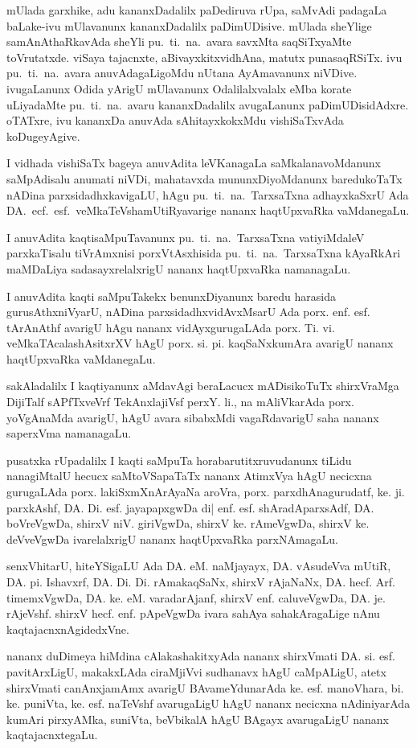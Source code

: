mUlada garxhike, adu kananxDadalilx paDediruva rUpa, saMvAdi padagaLa baLake-ivu mUlavanunx kananxDadalilx paDimUDisive. mUlada sheYlige samAnAthaRkavAda sheYli pu.~ti.~na.~avara savxMta saqSiTxyaMte toVrutatxde. viSaya tajacnxte, aBivayxkitxvidhAna, matutx punasaqRSiTx. ivu pu.~ti.~na.~avara anuvAdagaLigoMdu nUtana AyAmavanunx niVDive. ivugaLanunx Odida yArigU mUlavanunx Odalilalxvalalx eMba korate uLiyadaMte pu.~ti.~na.~avaru kananxDadalilx avugaLanunx paDimUDisidAdxre. oTATxre, ivu kananxDa anuvAda sAhitayxkokxMdu vishiSaTxvAda koDugeyAgive.

I vidhada vishiSaTx bageya anuvAdita leVKanagaLa saMkalanavoMdanunx saMpAdi\-salu anumati niVDi, mahatavxda mununxDiyoMdanunx baredukoTaTx nADina parxsidadhx\-kavi\-gaLU, hAgu pu.~ti.~na.~TarxsaTxna adhayxkaSxrU Ada DA.~ecf.~esf.~veMkaTeVshamUtiR\-yavarige nananx haqtUpxvaRka vaMdanegaLu.

I anuvAdita kaqtisaMpuTavanunx pu.~ti.~na.~TarxsaTxna vatiyiMdaleV parxkaTisalu tiVrAmxnisi porxVtAsxhisida pu.~ti.~na.~TarxsaTxna kAyaRkAri maMDaLiya sadasayxrelalxrigU nananx haqtUpxvaRka namanagaLu. 

I anuvAdita kaqti saMpuTakekx benunxDiyanunx baredu  harasida gurusAthxniVyarU, nADina parxsidadhxvidAvxMsarU Ada porx. enf. esf. tArAnAthf avarigU hAgu nananx vidAyxgurugaLAda porx. Ti. vi. veMkaTAcalashAsitxrXV hAgU porx. si. pi. kaqSaNxkumAra avarigU nananx haqtUpxvaRka vaMdanegaLu.

sakAladalilx I kaqtiyanunx aMdavAgi beraLacucx mADisikoTuTx shirxVraMga DijiTalf sAPfTxveVrf TekAnxlajiVsf perxY. li., na mAliVkarAda porx. yoVgAnaMda avarigU, hAgU avara sibabxMdi vagaRdavarigU saha nananx saperxVma namanagaLu.

pusatxka rUpadalilx I kaqti saMpuTa horabarutitxruvudanunx tiLidu nanagiMtalU hecucx saMtoVSapaTaTx nananx AtimxVya hAgU necicxna gurugaLAda porx. lakiSxmXnArAyaNa aroVra, porx. parxdhAnagurudatf, ke. ji. parxkAshf, DA. Di. esf. jayapapxgwDa di| enf. esf. shAradAparxsAdf, DA. boVreVgwDa, shirxV niV. giriVgwDa, shirxV ke. rAmeVgwDa, shirxV ke. deVveVgwDa ivarelalxrigU nananx haqtUpxvaRka parxNAmagaLu. 

senxVhitarU, hiteYSigaLU Ada DA. eM. naMjayayx, DA. vAsudeVva mUtiR, DA. pi. Ishavxrf, DA. Di. Di. rAmakaqSaNx, shirxV rAjaNaNx, DA. hecf. Arf. timemxVgwDa, DA. ke. eM. varadarAjanf, shirxV enf. caluveVgwDa, DA. je. rAjeVshf. shirxV hecf. enf. pApeVgwDa ivara sahAya sahakAragaLige nAnu kaqtajacnxnAgidedxVne.

nananx duDimeya hiMdina cAlakashakitxyAda nananx shirxVmati DA. si. esf. pavitArxLigU, makakxLAda ciraMjiVvi sudhanavx hAgU caMpALigU, atetx shirxVmati canAnxjamAmx avarigU BAvameYdunarAda ke. esf. manoVhara, bi. ke. puniVta, ke. esf. naTeVshf avarugaLigU hAgU nananx necicxna nAdiniyarAda kumAri pirxyAMka, suniVta, beVbikalA hAgU BAgayx avarugaLigU nananx kaqtajacnxtegaLu.

